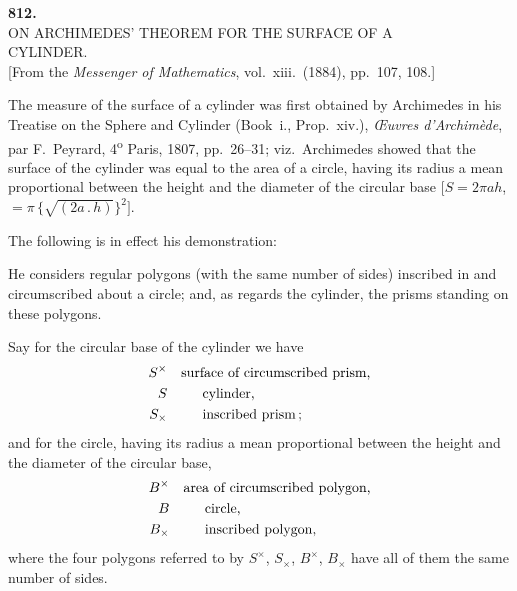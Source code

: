 \documentclass[11pt,a4paper]{article}
\begin{document}
\fancyhead[C]{\small\ }
\fancyhead[R]{\small [812}
\setcounter{page}{56}

\thispagestyle{plain}
\begin{center}
\vspace*{2em}
{\Large\bfseries 812.}\\[1.5em]
{\normalsize\scshape ON ARCHIMEDES' THEOREM FOR THE SURFACE OF A}\\[0.3em]
{\normalsize\scshape CYLINDER.}\\[1em]
{\small [From the \textit{Messenger of Mathematics}, vol.~xiii.\ (1884), pp.~107, 108.]}
\end{center}

\medskip
\noindent The measure of the surface of a cylinder was first obtained by Archimedes in his Treatise on the Sphere and Cylinder (Book~i., Prop.~xiv.), \textit{\OE{}uvres d'Archim\`ede}, par F.~Peyrard, 4\textsuperscript{o} Paris, 1807, pp.~26--31; viz.\ Archimedes showed that the surface of the cylinder was equal to the area of a circle, having its radius a mean proportional between the height and the diameter of the circular base $[S = 2\pi a h$, $= \pi\,\{\sqrt{(2a\,.\,h)}\}^{2}]$.

\medskip
The following is in effect his demonstration:

\medskip
He considers regular polygons (with the same number of sides) inscribed in and circumscribed about a circle; and, as regards the cylinder, the prisms standing on these polygons.

\medskip
Say for the circular base of the cylinder we have
\begin{align*}
S^{\times} &\quad \text{surface of circumscribed prism,}\\
S          &\quad \text{\hspace{0.6em}\dotfill\hspace{0.6em} cylinder,}\\
S_{\times} &\quad \text{\hspace{0.6em}\dotfill\hspace{0.6em} inscribed prism\,;}
\end{align*}
and for the circle, having its radius a mean proportional between the height and the diameter of the circular base,
\begin{align*}
B^{\times} &\quad \text{area of circumscribed polygon,}\\
B          &\quad \text{\hspace{0.6em}\dotfill\hspace{0.6em} circle,}\\
B_{\times} &\quad \text{\hspace{0.6em}\dotfill\hspace{0.6em} inscribed polygon,}
\end{align*}
where the four polygons referred to by $S^{\times}$, $S_{\times}$, $B^{\times}$, $B_{\times}$ have all of them the same number of sides.
\clearpage
\end{document}
